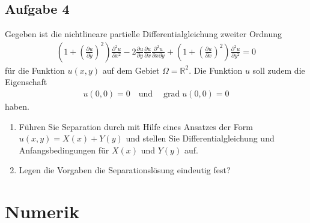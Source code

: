 \documentclass[
	final,
	a4paper,
	oneside,
	parskip=full,
	headings=standardclasses,
	headings=big,
	pointednumbers
]{scrartcl}
\begin{document}
    \subsection*{Aufgabe 4}

    Gegeben ist die nichtlineare partielle Differentialgleichung zweiter Ordnung
    \begin{align}
        \left( 1 + \left( \frac{\partial u}{\partial y} \right)^2 \right) \frac{\partial^2 u}{\partial x^2} -
        2 \frac{\partial u}{\partial y} \frac{\partial u}{\partial x} \frac{\partial^2 u}{\partial x \partial y} +
        \left( 1 + \left( \frac{\partial u}{\partial x} \right)^2 \right) \frac{\partial^2 u}{\partial y^2} = 0
    \end{align}
    für die Funktion $u{\left(x,  y\right)}$ auf dem Gebiet $\Omega = \mathbb{R}^2$. Die Funktion $u$ soll zudem
    die Eigenschaft
    \begin{align*}
        u{\left(0, 0 \right)} = 0 \quad \text{und} \quad \operatorname{grad}{u{\left(0, 0\right)}} = 0
    \end{align*}
    haben.
    \begin{enumerate}
        \item Führen Sie Separation durch mit Hilfe eines Ansatzes der Form
              $u{\left(x,  y\right)} = X{\left(x\right)} + Y{\left(y\right)}$ und stellen
              Sie Differentialgleichung und Anfangsbedingungen für $X{\left(x\right)}$ und
              $Y{\left(y\right)}$ auf.
        \item Legen die Vorgaben die Separationslösung eindeutig fest?
    \end{enumerate}

    \newpage
    
    \section*{Numerik}
\end{document}
